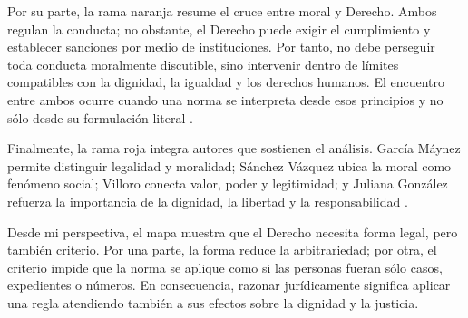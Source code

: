 \documentclass[
	spanish,
	letterpaper, oneside
]{article}
\begin{document}
Por su parte, la rama naranja resume el cruce entre moral y Derecho. Ambos regulan la conducta; no obstante, el Derecho puede exigir el cumplimiento y establecer sanciones por medio de instituciones. Por tanto, no debe perseguir toda conducta moralmente discutible, sino intervenir dentro de límites compatibles con la dignidad, la igualdad y los derechos humanos. El encuentro entre ambos ocurre cuando una norma se interpreta desde esos principios y no sólo desde su formulación literal \citep{garciaMaynezEtica,cndhMarcoNormativo2026}.

Finalmente, la rama roja integra autores que sostienen el análisis. García Máynez permite distinguir legalidad y moralidad; Sánchez Vázquez ubica la moral como fenómeno social; Villoro conecta valor, poder y legitimidad; y Juliana González refuerza la importancia de la dignidad, la libertad y la responsabilidad \citep{garciaMaynezEtica,sanchezVazquezEtica1969,villoroPoderValor1997,gonzalezEthosDestino1996}.

Desde mi perspectiva, el mapa muestra que el Derecho necesita forma legal, pero también criterio. Por una parte, la forma reduce la arbitrariedad; por otra, el criterio impide que la norma se aplique como si las personas fueran sólo casos, expedientes o números. En consecuencia, razonar jurídicamente significa aplicar una regla atendiendo también a sus efectos sobre la dignidad y la justicia.
\end{document}
